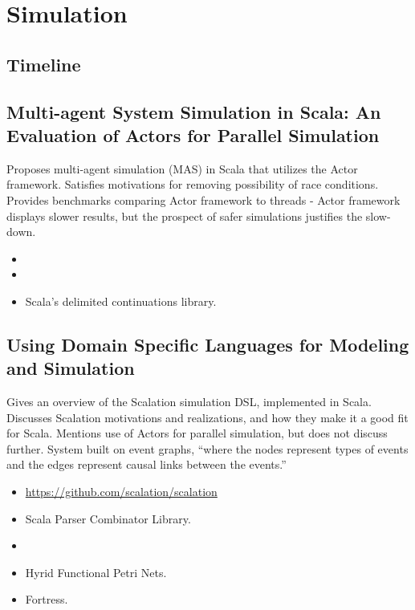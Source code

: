 \chapter {Simulation}

\section{Timeline}


\section {Multi-agent System Simulation in Scala: An Evaluation of Actors for
Parallel Simulation \cite{todd2011multi}}
Proposes multi-agent simulation (MAS) in Scala that utilizes the Actor
framework. Satisfies motivations for removing possibility of race conditions.
Provides benchmarks comparing Actor framework to threads - Actor framework
displays slower results, but the prospect of safer simulations justifies the
slow-down.
\begin{itemize}
    \item {}
    \item {}
    \item Scala's delimited continuations library.
\end{itemize}

\section {Using Domain Specific Languages for Modeling and Simulation \cite{miller2010using}}
Gives an overview of the Scalation simulation DSL, implemented in Scala.
Discusses Scalation motivations and realizations, and how they make it a good
fit for Scala. Mentions use of Actors for parallel simulation, but does not
discuss further. System built on event graphs, ``where the nodes represent types
of events and the edges represent causal links between the events.''
\begin{itemize}
    \item \href{https://github.com/scalation/scalation}{https://github.com/scalation/scalation}
    \item Scala Parser Combinator Library.
    \item {}
    \item Hyrid Functional Petri Nets.
    \item Fortress.
\end{itemize}